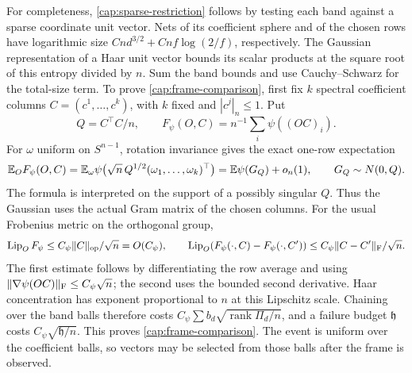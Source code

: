 For completeness, \eqref{cap:sparse-restriction} follows by testing each band
against a sparse coordinate unit vector. Nets of its coefficient sphere and of
the chosen rows have logarithmic size $Cnd^{3/2}+Cnf\log(2/f)$, respectively.
The Gaussian representation of a Haar unit vector bounds its scalar products
at the square root of this entropy divided by $n$. Sum the band bounds and use
Cauchy--Schwarz for the total-size term. To prove
\eqref{cap:frame-comparison}, first fix \(k\) spectral coefficient columns
\(C=(c^1,\ldots,c^k)\), with \(k\) fixed and \(|c^j|_n\le1\). Put
\[
 Q=C^\top C/n,\qquad
 F_\psi(O,C)=n^{-1}\sum_i\psi((OC)_i).
\]
For \(\omega\) uniform on \(S^{n-1}\), rotation invariance gives the exact
one-row expectation
\[
 \mathbb E_OF_\psi(O,C)
 =\mathbb E_\omega\psi\bigl(\sqrt n\,Q^{1/2}(\omega_1,\ldots,\omega_k)^\top\bigr)
 =\mathbb E\psi(G_Q)+o_n(1),\qquad G_Q\sim N(0,Q).
\]
The formula is interpreted on the support of a possibly singular \(Q\).
Thus the Gaussian uses the actual Gram matrix of the chosen columns.
For the usual Frobenius metric on the orthogonal group,
\[
 \operatorname{Lip}_O F_\psi
 \le C_\psi\|C\|_{\rm op}/\sqrt n=O(C_\psi),\qquad
 \operatorname{Lip}_O(F_\psi(\cdot,C)-F_\psi(\cdot,C'))
 \le C_\psi\|C-C'\|_{\rm F}/\sqrt n.
\]
The first estimate follows by differentiating the row average and using
\(\|\nabla\psi(OC)\|_{\rm F}\le C_\psi\sqrt n\); the second uses the
bounded second derivative. Haar concentration has exponent proportional to
\(n\) at this Lipschitz scale. Chaining over the band balls therefore costs
\(C_\psi\sum b_d\sqrt{\operatorname{rank}\Pi_d/n}\), and a failure budget
\(\mathfrak h\) costs \(C_\psi\sqrt{\mathfrak h/n}\).
This proves \eqref{cap:frame-comparison}. The event is uniform over the
coefficient balls, so vectors may be selected from those balls after the
frame is observed.

